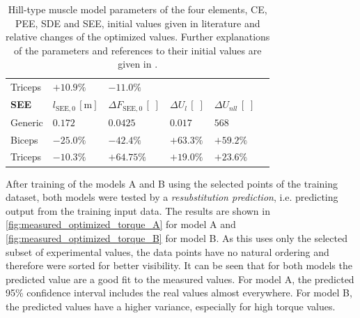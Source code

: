 \begin{table}[t]
\begin{tabular}{@{}llllll@{}}
    Triceps & $+10.9\%$ & $-11.0\%$  \\ %
    \addlinespace[2ex]
    \textbf{SEE} 
      & $l_{\mathrm{SEE},0}\,[\mathrm{m}]$ 
      & $\Delta F_{\mathrm{SEE},0} \,[\;]$  
      & $\Delta U_{l} \,[\;]$  
      & $\Delta U_{nll}\,[\;]$
      \\ \hline
    Generic & $0.172$ & $0.0425$ & $0.017$ & $568$ \\ %
    Biceps & $-25.0\%$ & $-42.4\%$ & $+63.3\%$ & $+59.2\%$ \\ %
    Triceps & $-10.3\%$ & $+64.75\%$ & $+19.0\%$ & $+23.6\%$ \\ %
    \bottomrule
  \end{tabular}

  \caption{Hill-type muscle model parameters of the four elements, CE, PEE, SDE and SEE, initial values given in literature and relative changes of the optimized values. Further explanations of the parameters and references to their initial values are given in \cite{Hilltype2014}.}
  \label{tab:model_b_parameters}
\end{table}

After training of the models A and B using the selected points of the training dataset, both models were tested by a \emph{resubstitution prediction}, i.e. predicting output from the training input data. The results are shown in \cref{fig:measured_optimized_torque_A} for model A and \cref{fig:measured_optimized_torque_B} for model B. As this uses only the selected subset of experimental values, the data points have no natural ordering and therefore were sorted for better visibility.
It can be seen that for both models the predicted value are a good fit to the measured values. For model A, the predicted 95\% confidence interval includes the real values almost everywhere. For model B, the predicted values have a higher variance, especially for high torque values.

